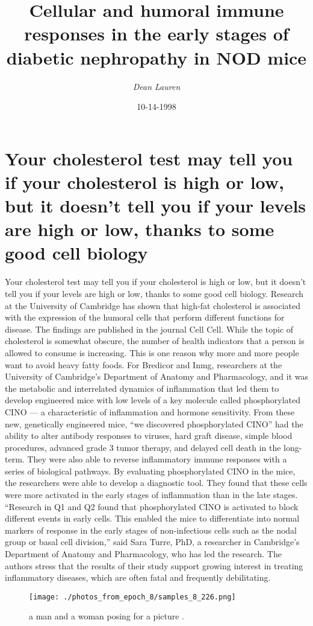 \documentclass{article}%
\title{Cellular and humoral immune responses in the early stages of diabetic nephropathy in NOD mice}%
\author{\textit{Dean Lauren}}%
\date{10-14-1998}%
\begin{document}
%
\normalsize%
\maketitle%
\section{Your cholesterol test may tell you if your cholesterol is high or low, but it doesn’t tell you if your levels are high or low, thanks to some good cell biology}%
\label{sec:Yourcholesteroltestmaytellyouifyourcholesterolishighorlow,butitdoesnttellyouifyourlevelsarehighorlow,thankstosomegoodcellbiology}%
Your cholesterol test may tell you if your cholesterol is high or low, but it doesn’t tell you if your levels are high or low, thanks to some good cell biology. Research at the University of Cambridge has shown that high{-}fat cholesterol is associated with the expression of the humoral cells that perform different functions for disease. The findings are published in the journal Cell Cell.\newline%
While the topic of cholesterol is somewhat obscure, the number of health indicators that a person is allowed to consume is increasing. This is one reason why more and more people want to avoid heavy fatty foods.\newline%
For Bredicor and Inmg, researchers at the University of Cambridge’s Department of Anatomy and Pharmacology, and it was the metabolic and interrelated dynamics of inflammation that led them to develop engineered mice with low levels of a key molecule called phosphorylated CINO — a characteristic of inflammation and hormone sensitivity.\newline%
From these new, genetically engineered mice, “we discovered phosphorylated CINO” had the ability to alter antibody responses to viruses, hard graft disease, simple blood procedures, advanced grade 3 tumor therapy, and delayed cell death in the long{-}term. They were also able to reverse inflammatory immune responses with a series of biological pathways.\newline%
By evaluating phosphorylated CINO in the mice, the researchers were able to develop a diagnostic tool. They found that these cells were more activated in the early stages of inflammation than in the late stages.\newline%
“Research in Q1 and Q2 found that phosphorylated CINO is activated to block different events in early cells. This enabled the mice to differentiate into normal markers of response in the early stages of non{-}infectious cells such as the nodal group or basal cell division,” said Sara Turre, PhD, a researcher in Cambridge’s Department of Anatomy and Pharmacology, who has led the research.\newline%
The authors stress that the results of their study support growing interest in treating inflammatory diseases, which are often fatal and frequently debilitating.\newline%

%


\begin{figure}[h!]%
\centering%
\texttt{[image: ./photos\_from\_epoch\_8/samples\_8\_226.png]}%
\caption{a man and a woman posing for a picture .}%
\end{figure}

%
\end{document}
